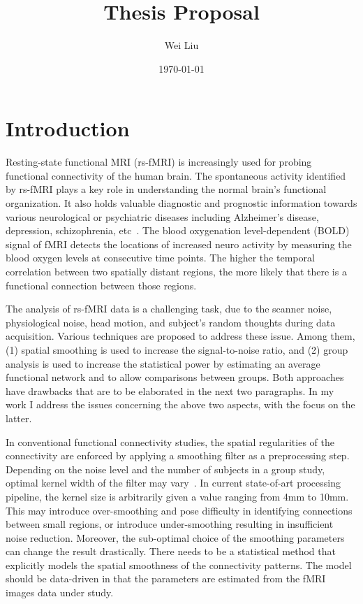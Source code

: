 \documentclass[12pt]{article}
\begin{document}
\title{Thesis Proposal}
\author{Wei Liu}
\date{\today} 

\maketitle 

\section{Introduction}

Resting-state functional MRI (rs-fMRI) is increasingly used for probing
functional connectivity of the human brain. The spontaneous activity identified
by rs-fMRI plays a key role in understanding the normal brain's functional
organization. It also holds valuable diagnostic and prognostic information
towards various neurological or psychiatric diseases including Alzheimer's
disease, depression, schizophrenia, etc~\cite{fox2007spontaneous}. The blood
oxygenation level-dependent (BOLD) signal of fMRI detects the locations of
increased neuro activity by measuring the blood oxygen levels at consecutive
time points. The higher the temporal correlation between two spatially distant
regions, the more likely that there is a functional connection between those
regions.

The analysis of rs-fMRI data is a challenging task, due to the scanner noise,
physiological noise, head motion, and subject's random thoughts during data
acquisition. Various techniques are proposed to address these issue. Among them,
(1) spatial smoothing is used to increase the signal-to-noise ratio, and (2)
group analysis is used to increase the statistical power by estimating an
average functional network and to allow comparisons between groups. Both
approaches have drawbacks that are to be elaborated in the next two paragraphs.
In my work I address the issues concerning the above two aspects, with the focus
on the latter.

In conventional functional connectivity studies, the spatial regularities of the
connectivity are enforced by applying a smoothing filter as a preprocessing
step. Depending on the noise level and the number of subjects in a group study,
optimal kernel width of the filter may vary~\cite{mikl2008effects}. In current
state-of-art processing pipeline, the kernel size is arbitrarily given a value
ranging from 4mm to 10mm. This may introduce over-smoothing and pose difficulty
in identifying connections between small regions, or introduce under-smoothing
resulting in insufficient noise reduction. Moreover, the sub-optimal choice of
the smoothing parameters can change the result drastically. There needs to be a
statistical method that explicitly models the spatial smoothness of the
connectivity patterns. The model should be data-driven in that the parameters
are estimated from the fMRI images data under study.
\end{document}
